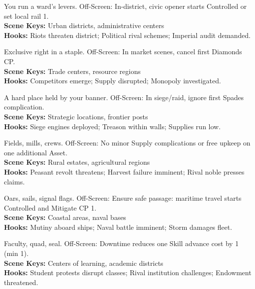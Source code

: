 \documentclass[12pt]{article}
\begin{document}
\begin{description}[leftmargin=*]
  \item[\textbf{City District License}] You run a ward's levers. Off-Screen: In-district, civic opener starts Controlled or set local rail 1. \\
  \textbf{Scene Keys:} Urban districts, administrative centers \\
  \textbf{Hooks:} Riots threaten district; Political rival schemes; Imperial audit demanded.

  \item[\textbf{Regional Monopoly}] Exclusive right in a staple. Off-Screen: In market scenes, cancel first Diamonds CP. \\
  \textbf{Scene Keys:} Trade centers, resource regions \\
  \textbf{Hooks:} Competitors emerge; Supply disrupted; Monopoly investigated.

  \item[\textbf{Fortress/Stronghold}] A hard place held by your banner. Off-Screen: In siege/raid, ignore first Spades complication. \\
  \textbf{Scene Keys:} Strategic locations, frontier posts \\
  \textbf{Hooks:} Siege engines deployed; Treason within walls; Supplies run low.

  \item[\textbf{Large Estate/Demesne}] Fields, mills, crews. Off-Screen: No minor Supply complications or free upkeep on one additional Asset. \\
  \textbf{Scene Keys:} Rural estates, agricultural regions \\
  \textbf{Hooks:} Peasant revolt threatens; Harvest failure imminent; Rival noble presses claims.

  \item[\textbf{Naval Fleet Share}] Oars, sails, signal flags. Off-Screen: Ensure safe passage: maritime travel starts Controlled and Mitigate CP 1. \\
  \textbf{Scene Keys:} Coastal areas, naval bases \\
  \textbf{Hooks:} Mutiny aboard ships; Naval battle imminent; Storm damages fleet.

  \item[\textbf{University College}] Faculty, quad, seal. Off-Screen: Downtime reduces one Skill advance cost by 1 (min 1). \\
  \textbf{Scene Keys:} Centers of learning, academic districts \\
  \textbf{Hooks:} Student protests disrupt classes; Rival institution challenges; Endowment threatened.


\end{description}
\end{document}

